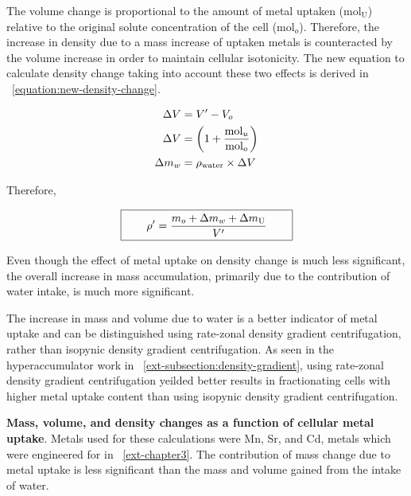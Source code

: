\documentclass[../main/main]{subfiles}
\begin{document}
The volume change is proportional to the amount of metal uptaken (mol$_{\text{U}}$) relative to the original solute concentration of the cell (mol$_o$). Therefore, the increase in density due to a mass increase of uptaken metals is counteracted by the volume increase in order to maintain cellular isotonicity. The new equation to calculate density change taking into account these two effects is derived in \EQUATION~\ref{equation:new-density-change}.

\begin{align}
	\Delta V &= V' - V_o
		\tagaddtext{[\si{\liter}]} \\
	\Delta V &= \left( 1 + \dfrac{\text{mol}_u}{\text{mol}_o} \right)
		\tagaddtext{[\si{\liter}]} \\
	\Delta m_w &= \rho_{\text{water}} \times \Delta V
		\tagaddtext{[\si{\gram}]}
\end{align}

Therefore,

\begin{equation}
	\boxed{\qquad
	\rho' = \dfrac{m_o + \Delta m_w + \Delta m_{\text{U}}}{V'}
		\tagaddtext{[\si{\gram\per\liter}]}
	\qquad}
	\label{equation:new-density-change}
\end{equation}

Even though the effect of metal uptake on density change is much less significant, the overall increase in mass accumulation, primarily due to the contribution of water intake, is much more significant.

The increase in mass and volume due to water is a better indicator of metal uptake and can be distinguished using rate-zonal density gradient centrifugation, rather than isopynic density gradient centrifugation. As seen in the hyperaccumulator work in \CHAPTER~\ref{ext-subsection:density-gradient}, using rate-zonal density gradient centrifugation yeilded better results in fractionating cells with higher metal uptake content than using isopynic density gradient centrifugation.

\begin{table}[H]
\singlespacing
\setlength\extrarowheight{1pt}
	\centering
	
	\caption[Mass, volume, and density changes as a function of cellular metal uptake]
	{
		\textbf{Mass, volume, and density changes as a function of cellular metal uptake}.
		Metals used for these calculations were Mn, Sr, and Cd, metals which were engineered for in \CHAPTER~\ref{ext-chapter3}. The contribution of mass change due to metal uptake is less significant than the mass and volume gained from the intake of water.
	}
\end{table}

\printbibliography[title=References]
\end{document}
